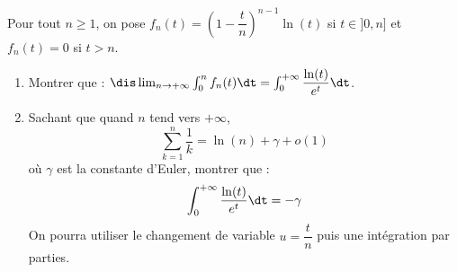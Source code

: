 \documentclass[a4paper,10pt]{report}
\begin{document}
\begin{Exa}
Pour tout $n \geq 1$, on pose $f_n(t) = \left( 1 - \dfrac{t}{n} \right)^{n-1}\ln(t)$ si $t \in ]0,n]$ et $f_n(t)=0$ si $t>n$.
\begin{enumerate}
\item Montrer que : $\dis \lim_{n \rightarrow + \infty} \int_{0}^n f_n(t) \dt = \int_{0}^{+ \infty} \dfrac{\ln(t)}{e^t} \dt$.
\item Sachant que quand $n$ tend vers $+ \infty$,
$$ \sum_{k=1}^n \dfrac{1}{k} = \ln(n)+ \gamma + o(1)$$
où $\gamma$ est la constante d'Euler, montrer que :
$$ \int_{0}^{+ \infty} \dfrac{\ln(t)}{e^t} \dt = - \gamma$$
On pourra utiliser le changement de variable $u=\dfrac{t}{n}$ puis une intégration par parties.
\end{enumerate}
\end{Exa}
\end{document}
